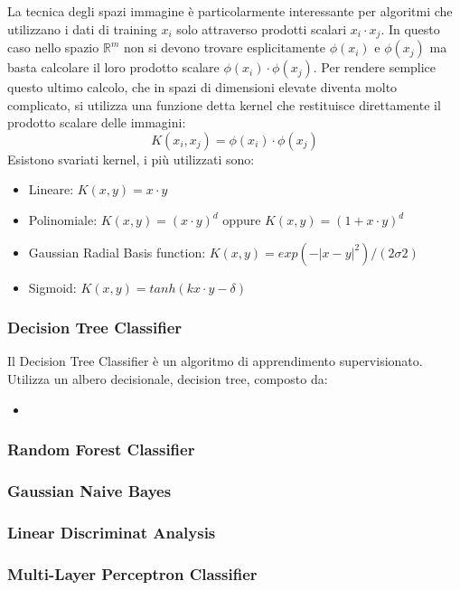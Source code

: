 \documentclass[12pt,italian]{report}
\begin{document}
La tecnica degli spazi immagine è particolarmente interessante per algoritmi che utilizzano i dati di training $x_i$ solo attraverso prodotti scalari $x_i \cdot x_j$. In questo caso nello spazio $\mathbb{R}^{m}$ non si devono trovare esplicitamente $\phi(x_i)$ e $\phi (x_j)$ ma basta calcolare il loro prodotto scalare $\phi (x_i) \cdot \phi (x_j)$. Per rendere semplice questo ultimo calcolo, che in spazi di dimensioni elevate diventa molto complicato, si utilizza una funzione detta kernel che restituisce direttamente il prodotto scalare delle immagini:
\begin{equation}
K(x_i, x_j) = \phi (x_i) \cdot \phi (x_j)
\end{equation}
Esistono svariati kernel, i più utilizzati sono:
\begin{itemize}
	\item Lineare: $K(x, y) = x \cdot y$
	\item Polinomiale: $K(x, y) = (x \cdot y)^{d}$ oppure $K(x, y) = (1 + x \cdot y)^{d}$
	\item Gaussian Radial Basis function: $K(x,y) = exp (- \left | x-y \right |^2)/(2 \sigma 2)$
	\item Sigmoid: $K(x,y) = tanh(k x \cdot y - \delta)$ 
\end{itemize}

\subsubsection{Decision Tree Classifier}
Il Decision Tree Classifier è un algoritmo di apprendimento supervisionato. Utilizza un albero decisionale, decision tree, composto da:
\begin{itemize}
	\item 
\end{itemize}
\subsubsection{Random Forest Classifier}
\subsubsection{Gaussian Naive Bayes}
\subsubsection{Linear Discriminat Analysis}
\subsubsection{Multi-Layer Perceptron Classifier}
\end{document}

